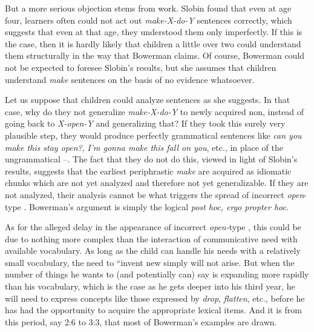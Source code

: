 But a more serious objection stems from  work.
Slobin found that even at age four,  learners often could not act out \textit{make-X-do-Y} sentences correctly, which suggests that even at that age, they understood them only imperfectly. If this is the case, then it is hardly likely that children a little over two could understand them structurally in the way that Bowerman claims. Of course, Bower\-man could not be expected to foresee Slobin's results, but she assumes that children understand \textit{make} sentences on the basis of no evidence whatsoever.

Let us suppose that children could analyze sentences as she suggests. In that case, why do they not generalize \textit{make-X-do-Y} to newly acquired non, instead of going back to \textit{X-open-Y} and generalizing that? If they took this surely very plausible step, they would produce perfectly grammatical sentences like \textit{can you make this stay open?}, \textit{I'm gonna make this fall on you}, etc., in place of the ungrammatical --. The fact that they do not do this, viewed in light of Slobin's results, suggests that the earliest periphrastic \textit{make}  are acquired as idiomatic chunks which are not yet analyzed and therefore not yet generalizable. If they are not analyzed, their analysis cannot be what triggers the spread of incorrect \textit{open}-type . Bowerman's argument is simply the logical \textit{post hoc, ergo propter hoc}.

As for the alleged delay in the appearance of incorrect \textit{open-}type , this could be due to nothing more complex than the interaction of communicative need with available vocabulary. As long as the child can handle his needs with a relatively small vocabulary, the need to ``invent new  simply will not arise. But when the number of things he wants to (and potentially can) say is expanding more rapidly than his vocabulary, which is the case as he gets deeper into his third year, he will need to express concepts like those expressed by \textit{drop}, \textit{flatten}, etc., before he has had the opportunity to acquire the appropriate lexical items. And it is from this period, say 2:6 to 3:3, that most of Bowerman's examples are drawn.\\\\

